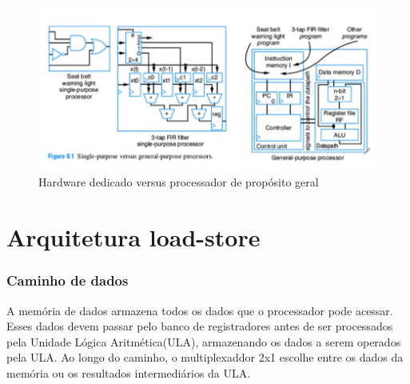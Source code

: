 \documentclass{article}
\begin{document}
\begin{figure}[h!] 
    \centering 
    \includegraphics[width=1\textwidth]{imgs/x.jpg} 
    \caption{Hardware dedicado versus processador de propósito geral} 
    \label{fig:comparacao1} 
\end{figure}

\newpage
\section{Arquitetura load-store}
\subsubsection{Caminho de dados}

A memória de dados armazena todos os dados que o processador pode acessar. Esses dados devem passar pelo banco de registradores antes de ser processados pela Unidade Lógica Aritmética(ULA), armazenando os dados a serem operados pela ULA. Ao longo do caminho, o multiplexaddor 2x1 escolhe entre os dados da memória ou os resultados intermediários da ULA.
\end{document}
